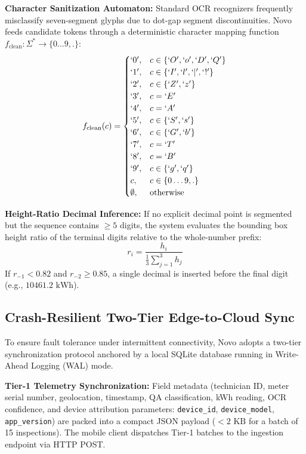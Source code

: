\documentclass[conference]{IEEEtran}
\begin{document}
\textbf{Character Sanitization Automaton:} Standard OCR recognizers frequently misclassify seven-segment glyphs due to dot-gap segment discontinuities. Novo feeds candidate tokens through a deterministic character mapping function $f_{\text{clean}}: \Sigma^* \to \{0\dots9, .\}$:
\begin{equation}
f_{\text{clean}}(c) = 
\begin{cases}
`0', & c \in \{`O', `o', `D', `Q'\} \\
`1', & c \in \{`I', `l', `|', `!'\} \\
`2', & c \in \{`Z', `z'\} \\
`3', & c = `E' \\
`4', & c = `A' \\
`5', & c \in \{`S', `s'\} \\
`6', & c \in \{`G', `b'\} \\
`7', & c = `T' \\
`8', & c = `B' \\
`9', & c \in \{`g', `q'\} \\
c, & c \in \{0\dots9, .\} \\
\emptyset, & \text{otherwise}
\end{cases}
\label{eq:sanitizer}
\end{equation}

\textbf{Height-Ratio Decimal Inference:} If no explicit decimal point is segmented but the sequence contains $\ge 5$ digits, the system evaluates the bounding box height ratio of the terminal digits relative to the whole-number prefix:
\begin{equation}
r_i = \frac{h_i}{\frac{1}{3}\sum_{j=1}^3 h_j}
\label{eq:height_ratio}
\end{equation}
If $r_{-1} < 0.82$ and $r_{-2} \ge 0.85$, a single decimal is inserted before the final digit (e.g., $10461.2\text{~kWh}$).

\subsection{Crash-Resilient Two-Tier Edge-to-Cloud Sync}
To ensure fault tolerance under intermittent connectivity, Novo adopts a two-tier synchronization protocol anchored by a local SQLite database running in Write-Ahead Logging (WAL) mode.

\textbf{Tier-1 Telemetry Synchronization:} Field metadata (technician ID, meter serial number, geolocation, timestamp, QA classification, kWh reading, OCR confidence, and device attribution parameters: \texttt{device\_id}, \texttt{device\_model}, \texttt{app\_version}) are packed into a compact JSON payload ($<2\text{~KB}$ for a batch of 15 inspections). The mobile client dispatches Tier-1 batches to the ingestion endpoint via HTTP POST. 
\end{document}

